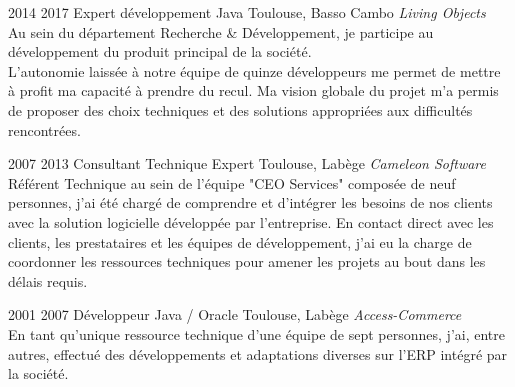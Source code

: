 \documentclass{friggeri-cv} 	%
\begin{document}
\begin{entrylist}
\entry
{2014  2017}
{Expert développement Java}
{Toulouse, Basso Cambo}
{\vspace{0.2cm}\emph{Living Objects} \\
Au sein du département Recherche \& Développement, je participe au développement du produit principal de la société.\\
L’autonomie laissée à notre équipe de quinze développeurs me permet de mettre à profit ma capacité à prendre du recul. Ma vision globale du projet m’a permis de proposer des choix techniques et des solutions appropriées aux difficultés rencontrées.
\\}
\end{entrylist}
\begin{entrylist}
\entry
{2007  2013}
{Consultant Technique Expert}
{Toulouse, Labège}
{\vspace{0.2cm}\emph{Cameleon Software} \\
Référent Technique au sein de l’équipe "CEO Services" composée de neuf personnes, j’ai été chargé de comprendre et d’intégrer les besoins de nos clients avec la solution logicielle développée par l’entreprise. En contact direct avec les clients, les prestataires et les équipes de développement, j’ai eu la charge de coordonner les ressources techniques pour amener les projets au bout dans les délais requis.
\
}

\entry
{2001  2007}
{Développeur Java / Oracle}
{Toulouse, Labège}
{\vspace{0.2cm}\emph{Access-Commerce}  \\
En tant qu’unique ressource technique d'une équipe de sept personnes, j’ai, entre autres, effectué des développements et adaptations diverses sur l’ERP intégré par la société.
}
\end{entrylist}

\end{document}
